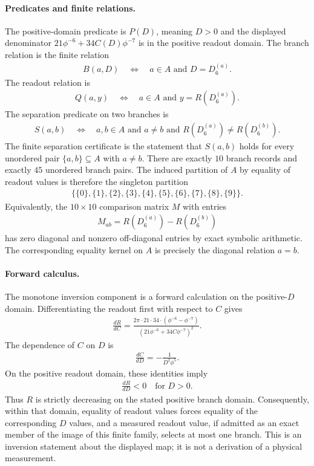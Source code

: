 \paragraph{Predicates and finite relations.}
The positive-domain predicate is $P(D)$, meaning $D>0$ and the displayed denominator $21\phi^{-6}+34C(D)\phi^{-7}$ is in the positive readout domain.  The branch relation is the finite relation
$$
\begin{aligned}
B(a,D)\quad\Longleftrightarrow\quad a\in A\text{ and }D=D_6^{(a)}.
\end{aligned}
$$
The readout relation is
$$
\begin{aligned}
Q(a,y)\quad\Longleftrightarrow\quad a\in A\text{ and }y=R(D_6^{(a)}).
\end{aligned}
$$
The separation predicate on two branches is
$$
\begin{aligned}
S(a,b)\quad\Longleftrightarrow\quad a,b\in A\text{ and }a\ne b\text{ and }R(D_6^{(a)})\ne R(D_6^{(b)}).
\end{aligned}
$$
The finite separation certificate is the statement that $S(a,b)$ holds for every unordered pair $\{a,b\}\subseteq A$ with $a\ne b$.  There are exactly $10$ branch records and exactly $45$ unordered branch pairs.  The induced partition of $A$ by equality of readout values is therefore the singleton partition
$$
\begin{aligned}
\{\{0\},\{1\},\{2\},\{3\},\{4\},\{5\},\{6\},\{7\},\{8\},\{9\}\}.
\end{aligned}
$$
Equivalently, the $10\times 10$ comparison matrix $M$ with entries
$$
\begin{aligned}
M_{ab}=R(D_6^{(a)})-R(D_6^{(b)})
\end{aligned}
$$
has zero diagonal and nonzero off-diagonal entries by exact symbolic arithmetic.  The corresponding equality kernel on $A$ is precisely the diagonal relation $a=b$.

\paragraph{Forward calculus.}
The monotone inversion component is a forward calculation on the positive-$D$ domain.  Differentiating the readout first with respect to $C$ gives
$$
\begin{aligned}
\frac{dR}{dC}=\frac{2\pi\cdot 21\cdot 34\cdot(\phi^{-6}-\phi^{-7})}{(21\phi^{-6}+34C\phi^{-7})^2}.
\end{aligned}
$$
The dependence of $C$ on $D$ is
$$
\begin{aligned}
\frac{dC}{dD}=-\frac{1}{D^2\phi^5}.
\end{aligned}
$$
On the positive readout domain, these identities imply
$$
\begin{aligned}
\frac{dR}{dD}<0\quad\text{for }D>0.
\end{aligned}
$$
Thus $R$ is strictly decreasing on the stated positive branch domain.  Consequently, within that domain, equality of readout values forces equality of the corresponding $D$ values, and a measured readout value, if admitted as an exact member of the image of this finite family, selects at most one branch.  This is an inversion statement about the displayed map; it is not a derivation of a physical measurement.

